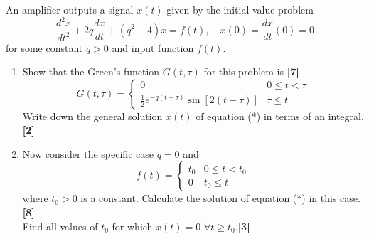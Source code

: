 \documentclass[a4paper]{article}
\begin{document}
\newpage
\begin{qns}
An amplifier outputs a signal $x(t)$ given by the initial-value problem
\begin{equation}
    \frac{d^2x}{dt^2}+2q\frac{dx}{dt}+(q^2+4)x=f(t),\quad x(0)=\frac{dx}{dt}(0)=0\tag{*}
\end{equation}
for some constant $q>0$ and input function $f(t)$.
\begin{enumerate}[label=(\alph*)]
\item Show that the Green’s function $G(t,\tau)$ for this problem is \hfill\textbf{[7]}
$$G(t,\tau)=
\left\{
        \begin{array}{ll}
      0 & 0\leq t<\tau \\
      \frac{1}{2}e^{-q(t-\tau)}\sin[2(t-\tau)] & \tau\leq t
        \end{array}
    \right.$$
Write down the general solution $x(t)$ of equation (*) in terms of an integral.\hfill\textbf{[2]}
\item Now consider the specific case $q = 0$ and
$$f(t)=
\left\{
        \begin{array}{ll}
      t_0 & 0\leq t<t_0 \\
      0 & t_0\leq t
        \end{array}
    \right.$$
    where $t_0>0$ is a constant. Calculate the solution of equation (*) in this case.\hfill\textbf{[8]}\\[5pt]
    Find all values of $t_0$ for which $x(t)=0$ $\forall t\geq t_0$.\hfill\textbf{[3]}
    \end{enumerate}
\end{qns}
\end{document}
